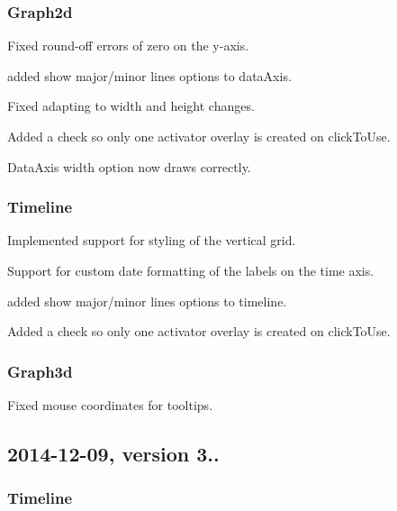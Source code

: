 \subsubsection*{Graph2d}


\begin{DoxyItemize}
\item Fixed round-\/off errors of zero on the y-\/axis.
\item added show major/minor lines options to data\+Axis.
\item Fixed adapting to width and height changes.
\item Added a check so only one \textquotesingle{}activator\textquotesingle{} overlay is created on click\+To\+Use.
\item Data\+Axis width option now draws correctly.
\end{DoxyItemize}

\subsubsection*{Timeline}


\begin{DoxyItemize}
\item Implemented support for styling of the vertical grid.
\item Support for custom date formatting of the labels on the time axis.
\item added show major/minor lines options to timeline.
\item Added a check so only one \textquotesingle{}activator\textquotesingle{} overlay is created on click\+To\+Use.
\end{DoxyItemize}

\subsubsection*{Graph3d}


\begin{DoxyItemize}
\item Fixed mouse coordinates for tooltips.
\end{DoxyItemize}

\subsection*{2014-\/12-\/09, version 3..}

\subsubsection*{Timeline}


